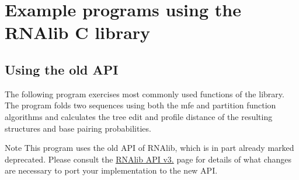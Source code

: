 \hypertarget{mp_example_example_c}{}\section{Example programs using the R\+N\+Alib C library}\label{mp_example_example_c}
\hypertarget{mp_example_examples_c_old_API}{}\subsection{Using the \textquotesingle{}old\textquotesingle{} A\+PI}\label{mp_example_examples_c_old_API}
The following program exercises most commonly used functions of the library. The program folds two sequences using both the mfe and partition function algorithms and calculates the tree edit and profile distance of the resulting structures and base pairing probabilities.

\begin{DoxyNote}{Note}
This program uses the old A\+PI of R\+N\+Alib, which is in part already marked deprecated. Please consult the \hyperlink{newAPI}{R\+N\+Alib A\+PI v3.} page for details of what changes are necessary to port your implementation to the new A\+PI.
\end{DoxyNote}

